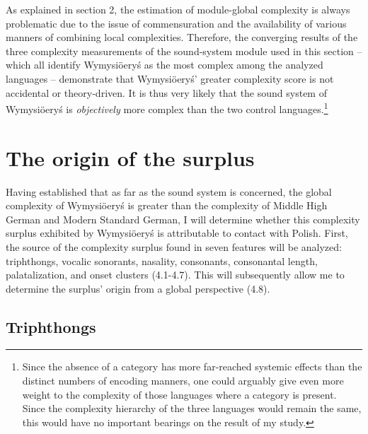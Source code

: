 \documentclass[output=paper]{langscibook}
\begin{document}
As explained in section 2, the estimation of module-global complexity is always problematic due to the issue of commensuration and the availability of various manners of combining local complexities. Therefore, the converging results of the three complexity measurements of the sound-system module used in this section – which all identify Wymysiöeryś as the most complex among the analyzed languages – demonstrate that Wymysiöeryś’ greater complexity score is not accidental or theory-driven. It is thus very likely that the sound system of Wymysiöeryś is \textit{objectively} more complex than the two control languages.\footnote{Since the absence of a category has more far-reached systemic effects than the distinct numbers of encoding manners, one could arguably give even more weight to the complexity of those languages where a category is present. Since the complexity hierarchy of the three languages would remain the same, this would have no important bearings on the result of my study.}

\section{The origin of the surplus} %

Having established that as far as the sound system is concerned, the global complexity of Wymysiöeryś is greater than the complexity of Middle High German and Modern Standard German, I will determine whether this complexity surplus exhibited by Wymysiöeryś is attributable to contact with Polish. First, the source of the complexity surplus found in seven features will be analyzed: triphthongs, vocalic sonorants, nasality, consonants, consonantal length, palatalization, and onset clusters (4.1-4.7). This will subsequently allow me to determine the surplus’ origin from a global perspective (4.8).

\subsection{Triphthongs}\label{sec:wymsorys:4.1}
\end{document}
